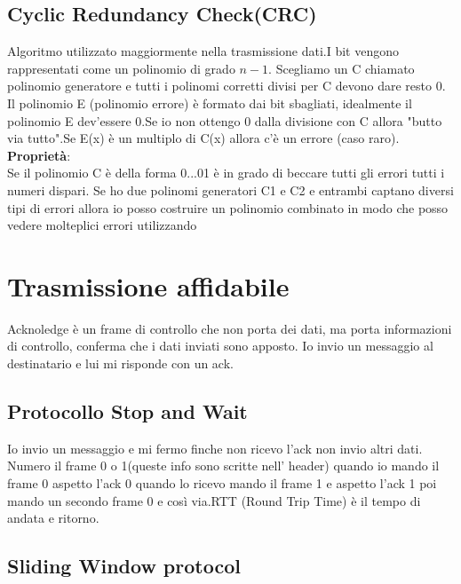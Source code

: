 \subsection{Cyclic Redundancy Check(CRC)}
Algoritmo utilizzato maggiormente nella trasmissione dati.I bit vengono rappresentati come un polinomio di grado $n-1$. Scegliamo un C chiamato polinomio generatore e tutti i polinomi corretti divisi per C devono dare resto 0. Il polinomio E (polinomio errore) è formato dai bit sbagliati, idealmente il polinomio E dev'essere 0.Se io non ottengo 0 dalla divisione con C allora "butto via tutto".Se E(x) è un multiplo di C(x) allora c'è un errore (caso raro). \\
\textbf{Proprietà}: \\
Se il polinomio C è della forma 0...01 è in grado di beccare tutti gli errori tutti i numeri dispari. Se ho due polinomi generatori C1 e C2 e entrambi captano diversi tipi di errori allora io posso costruire un polinomio combinato in modo che posso vedere molteplici errori utilizzando
\section{Trasmissione affidabile}
Acknoledge è un frame di controllo che non porta dei dati, ma porta informazioni di controllo, conferma che i dati inviati sono apposto. Io invio un messaggio al destinatario e lui mi risponde con un ack.
\subsection{Protocollo Stop and Wait}
Io invio un messaggio e mi fermo finche non ricevo l'ack non invio altri dati. Numero il frame 0 o 1(queste info sono scritte nell' header) quando io mando il frame 0 aspetto l'ack 0 quando lo ricevo mando il frame 1 e aspetto l'ack 1 poi mando un secondo frame 0 e così via.RTT (Round Trip Time) è il tempo di andata e ritorno. 
\subsection{Sliding Window protocol}
